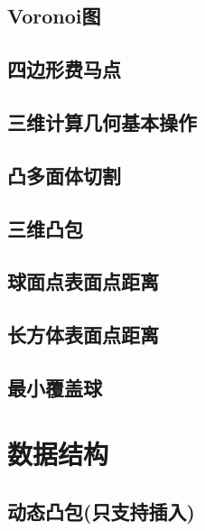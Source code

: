 \documentclass[10pt]{article}
\begin{document}
	\subsection{Voronoi图}
		

	\subsection{四边形费马点}
		

	\subsection{三维计算几何基本操作}
		

	\subsection{凸多面体切割}
		

	\subsection{三维凸包}
		

	\subsection{球面点表面点距离}
		
		
	\subsection{长方体表面点距离}
		

	\subsection{最小覆盖球}
		

\section{数据结构}
	\subsection{动态凸包(只支持插入)}
		
\end{document}
